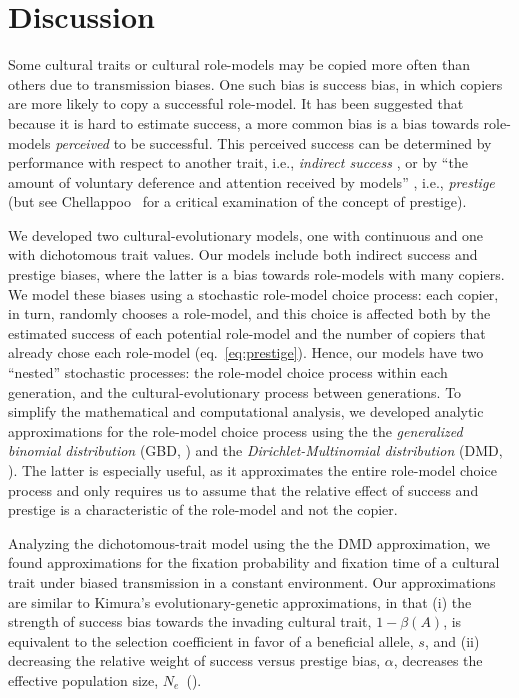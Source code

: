 \documentclass[12pt]{extarticle}
\begin{document}
\section*{Discussion}
Some cultural traits or cultural role-models may be copied more often than others due to transmission biases. 
One such bias is success bias, in which copiers are more likely to copy a successful role-model. 
It has been suggested that because it is hard to estimate success, a more common bias is a bias towards role-models \emph{perceived} to be successful.
This perceived success can be determined by performance with respect to another trait, i.e., \emph{indirect success} \citep{evolutionBook,fijian_social_bias}, or by ``the amount of voluntary deference and attention received by models'' \citep{prestigeSocialLearn}, i.e., \emph{prestige} \citep{prestige_cultural_learning,prestige_evolution} (but see Chellappoo~\citep{rethinkPrestige} for a critical examination of the concept of prestige).

We developed two cultural-evolutionary models, one with continuous and one with dichotomous trait values.
Our models include both indirect success and prestige biases, where the latter is a bias towards role-models with many copiers. We model these biases using a stochastic role-model choice process: each copier, in turn, randomly chooses a role-model, and this choice is affected both by the estimated success of each potential role-model and the number of copiers that already chose each role-model (eq.~\ref{eq:prestige}). 
Hence, our models have two ``nested'' stochastic processes: the role-model choice process within each generation, and the cultural-evolutionary process between generations.
To simplify the mathematical and computational analysis, we developed analytic approximations for the role-model choice process using the the {\em generalized binomial distribution} (GBD, ) and the {\em Dirichlet-Multinomial distribution} (DMD, ).
The latter is especially useful, as it approximates the entire role-model choice process and only requires us to assume that the relative effect of success and prestige is a characteristic of the role-model and not the copier.

Analyzing the dichotomous-trait model using the the DMD approximation, we found approximations for the fixation probability and fixation time of a cultural trait under biased transmission in a constant environment.
Our approximations are similar to Kimura's evolutionary-genetic approximations, in that (i) the strength of success bias towards the invading cultural trait, $1-\beta(A)$, is equivalent to the selection coefficient in favor of a beneficial allele, $s$, and (ii) decreasing the relative weight of success versus prestige bias, $\alpha$, decreases the effective population size, $N_e$~().
\end{document}

